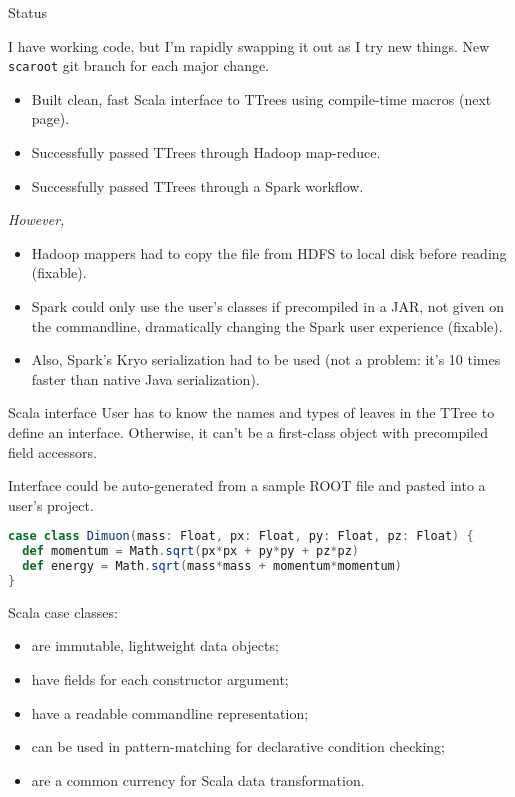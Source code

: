 \documentclass{beamer}
\begin{document}
\begin{frame}{Status}

\begin{block}{}
\vspace{-\baselineskip}
I have working code, but I'm rapidly swapping it out as I try new things. New {\tt scaroot} git branch for each major change.
\end{block}

\begin{itemize}
\item Built clean, fast Scala interface to TTrees using compile-time macros (next page).
\item Successfully passed TTrees through Hadoop map-reduce.
\item Successfully passed TTrees through a Spark workflow.
\end{itemize}

{\it However,}
\begin{itemize}
\item Hadoop mappers had to copy the file from HDFS to local disk before reading (fixable).
\item Spark could only use the user's classes if precompiled in a JAR, not given on the commandline, dramatically changing the Spark user experience (fixable).
\item Also, Spark's Kryo serialization had to be used (not a problem: it's 10 times faster than native Java serialization).
\end{itemize}
\end{frame}

\begin{frame}[fragile]{Scala interface}
User has to know the names and types of leaves in the TTree to define an interface. Otherwise, it can't be a first-class object with precompiled field accessors.

\vspace{0.5\baselineskip}
Interface could be auto-generated from a sample ROOT file and pasted into a user's project.

\begin{minipage}{1.1\linewidth}
\begin{lstlisting}[language=scala]
case class Dimuon(mass: Float, px: Float, py: Float, pz: Float) {
  def momentum = Math.sqrt(px*px + py*py + pz*pz)
  def energy = Math.sqrt(mass*mass + momentum*momentum)
}
\end{lstlisting}
\end{minipage}

Scala case classes:
\begin{itemize}
\item are immutable, lightweight data objects;
\item have fields for each constructor argument;
\item have a readable commandline representation;
\item can be used in pattern-matching for declarative condition checking;
\item are a common currency for Scala data transformation.
\end{itemize}
\end{frame}
\end{document}
